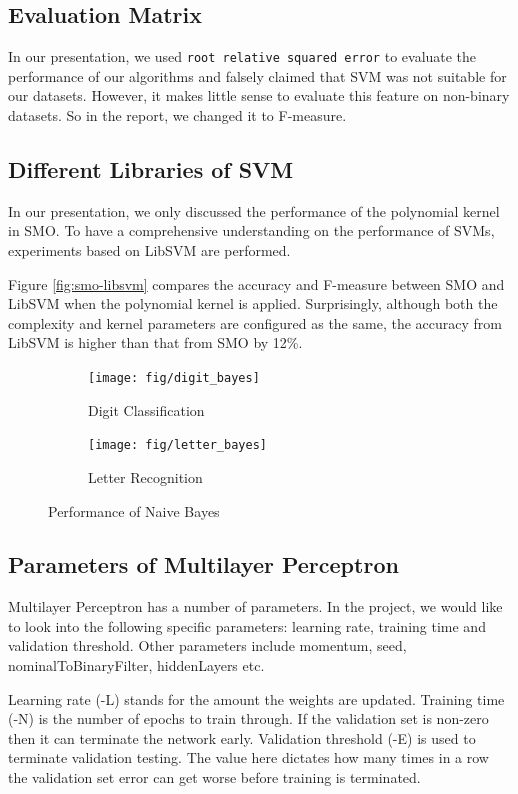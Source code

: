 \documentclass[11pt]{article}
\begin{document}
\subsection{Evaluation Matrix}
In our presentation, we used \texttt{root relative squared error} to evaluate the performance of our algorithms and falsely claimed that SVM was not suitable for our datasets. However, it makes little sense to evaluate this feature on  non-binary datasets. So in the report, we changed it to F-measure.

\subsection{Different Libraries of SVM}

In our presentation, we only discussed the performance of the polynomial kernel in SMO. To have a comprehensive understanding on the performance of SVMs, experiments based on LibSVM are performed.

Figure \ref{fig:smo-libsvm} compares the accuracy and F-measure between SMO and LibSVM when the polynomial kernel is applied. Surprisingly, although both the complexity and kernel parameters are configured as the same, the accuracy from LibSVM is higher than that from SMO by 12\%. 

\begin{figure}[htbp]
\centering

\begin{subfigure}[htbp]{0.46\columnwidth}
\texttt{[image: fig/digit\_bayes]}
\caption{Digit Classification}
\label{fig:digit-bayes}
\end{subfigure}
\hfill
\begin{subfigure}[htbp]{0.46\columnwidth}
\texttt{[image: fig/letter\_bayes]}
\caption{Letter Recognition}
\label{fig:letter-bayes}
\end{subfigure}
\caption{Performance of Naive Bayes}
\label{fig:bayes}
\end{figure}

\subsection{Parameters of Multilayer Perceptron}
Multilayer Perceptron has a number of parameters. In the project, we would like to look into the following specific parameters: learning rate, training time and validation threshold. Other parameters include momentum, seed, nominalToBinaryFilter, hiddenLayers etc.

Learning rate (-L) stands for the amount the weights are updated. Training time (-N) is the number of epochs to train through. If the validation set is non-zero then it can terminate the network early. Validation threshold (-E) is used to terminate validation testing. The value here dictates how many times in a row the validation set error can get worse before training is terminated.
\end{document}
